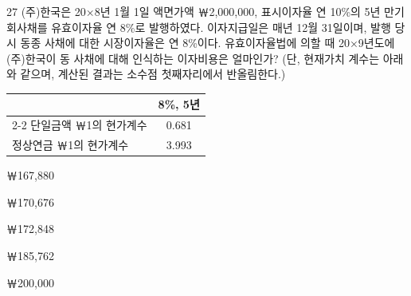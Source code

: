 \begin{question}{27}
(주)한국은 20×8년 1월 1일 액면가액 ￦2,000,000, 표시이자율 연 10\%의 5년 만기 회사채를 유효이자율 연 8\%로 발행하였다. 이자지급일은 매년 12월 31일이며, 발행 당시 동종 사채에 대한 시장이자율은 연 8\%이다. 유효이자율법에 의할 때 20×9년도에 (주)한국이 동 사채에 대해 인식하는 이자비용은 얼마인가? (단, 현재가치 계수는 아래와 같으며, 계산된 결과는 소수점 첫째자리에서 반올림한다.)

{\small\centering
\begin{tabular}{@{}l c@{}}
\hline
 & 8\%, 5년 \\
\cline{2-2}
단일금액 ￦1의 현가계수 & 0.681 \\
정상연금 ￦1의 현가계수 & 3.993 \\
\hline
\end{tabular}\par}
\begin{choices}
  \item ￦167,880
  \item ￦170,676
  \item ￦172,848
  \item ￦185,762
  \item ￦200,000
\end{choices}
\end{question}
